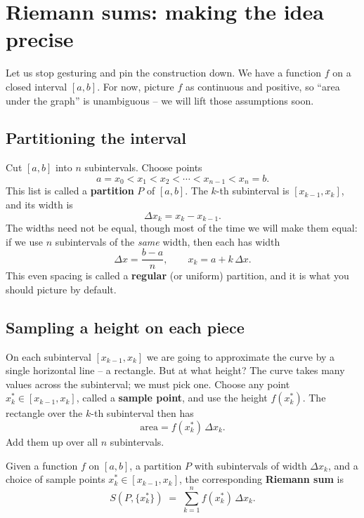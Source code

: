\section{Riemann sums: making the idea precise}
\label{ch20:riemann}

Let us stop gesturing and pin the construction down. We have a function $f$ on a
closed interval $[a,b]$. For now, picture $f$ as continuous and positive, so
``area under the graph'' is unambiguous -- we will lift those assumptions soon.

\subsection{Partitioning the interval}

Cut $[a,b]$ into $n$ subintervals. Choose points
\[
  a = x_0 < x_1 < x_2 < \cdots < x_{n-1} < x_n = b.
\]
This list is called a \textbf{partition} $P$ of $[a,b]$. The $k$-th subinterval
is $[x_{k-1}, x_k]$, and its width is
\[
  \Delta x_k = x_k - x_{k-1}.
\]
The widths need not be equal, though most of the time we will make them equal:
if we use $n$ subintervals of the \emph{same} width, then each has width
\[
  \Delta x = \frac{b-a}{n}, \qquad x_k = a + k\,\Delta x.
\]
This even spacing is called a \textbf{regular} (or uniform) partition, and it is
what you should picture by default.

\subsection{Sampling a height on each piece}

On each subinterval $[x_{k-1}, x_k]$ we are going to approximate the curve by a
single horizontal line -- a rectangle. But at what height? The curve takes many
values across the subinterval; we must pick one. Choose any point
$x_k^\ast \in [x_{k-1}, x_k]$, called a \textbf{sample point}, and use the height
$f(x_k^\ast)$. The rectangle over the $k$-th subinterval then has
\[
  \text{area} = f(x_k^\ast)\,\Delta x_k.
\]
Add them up over all $n$ subintervals.

\begin{definition}
\label{ch20:def-riemann-sum}
Given a function $f$ on $[a,b]$, a partition $P$ with subintervals of width
$\Delta x_k$, and a choice of sample points $x_k^\ast \in [x_{k-1},x_k]$, the
corresponding \textbf{Riemann sum} is
\[
  S(P, \{x_k^\ast\}) \;=\; \sum_{k=1}^{n} f(x_k^\ast)\,\Delta x_k.
\]
\end{definition}

